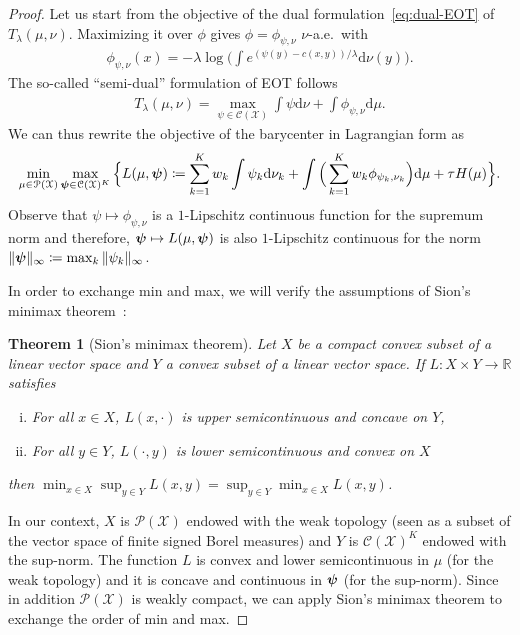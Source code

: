 \documentclass[11pt]{article}
\newcommand{\rev}[1]{{#1}}
\newcommand{\RR}{\mathbb{R}}
\newcommand{\Cc}{\mathcal{C}}
\newcommand{\Pp}{\mathcal{P}}
\newcommand{\Xx}{\mathcal{X}}
\renewcommand{\d}{\mathrm{d}}
\newtheorem{theorem}{Theorem}[section]
\begin{document}
\begin{proof}
Let us start from the objective of the dual formulation~\eqref{eq:dual-EOT} of $T_\lambda(\mu,\nu)$. Maximizing it over $\phi$ gives $\phi=\phi_{\psi,\nu}$ $\nu$-a.e.\ with 
\begin{align}\label{eq:soft-c-transform}
\phi_{\psi,\nu}(x) = -\lambda \log \Big( \int e^{(\psi(y)-c(x,y))/\lambda}\d\nu(y)\Big).
\end{align}
The so-called ``semi-dual'' formulation of EOT follows
\begin{align}\label{eq:semi-dual-EOT}
T_\lambda(\mu,\nu) = \max_{\psi\in \Cc(\Xx)} \int \psi\d\nu +\int \phi_{\psi,\nu}\d\mu.
\end{align}
We can thus rewrite the objective of the barycenter in Lagrangian form as
\begin{align*}
\min_{\mu\in \Pp(\Xx)} \max_{\bpsi \in \Cc(\Xx)^K} \Big\{L(\mu,\bpsi) \coloneqq \sum_{k=1}^K w_k \int  \psi_k\d\nu_k + \int  \Big( \sum_{k=1}^K w_k \phi_{\psi_k,\nu_k}\Big)\d\mu +\tau H(\mu)\Big\}.
\end{align*}
Observe that $\psi\mapsto \phi_{\psi,\nu}$ is a $1$-Lipschitz continuous function for the supremum norm and therefore, ${\boldsymbol{\psi}} \mapsto L(\mu,{\boldsymbol{\psi}})$ is also $1$-Lipschitz continuous for the norm $\Vert {\boldsymbol{\psi}}\Vert_\infty \coloneqq \max_k \Vert \psi_k\Vert_\infty$.
\rev{In order to exchange min and max, we will verify the assumptions of Sion's minimax theorem~\cite[Cor.~3.3]{sion1958general}:
\begin{theorem}[Sion's minimax theorem]\label{thm:Sion}
Let $X$ be a compact convex subset of a linear vector space and $Y$ a convex subset of a linear vector space. If $L:X\times Y\to \RR$ satisfies
\begin{enumerate}[(i)]
\item For all $x\in X$, $L(x,\cdot)$ is upper semicontinuous and concave on $Y$,
\item For all $y \in Y$, $L(\cdot,y)$ is lower semicontinuous and convex on $X$
\end{enumerate}
then $\min_{x\in X}\sup_{y\in Y} L(x,y) = \sup_{y\in Y} \min_{x\in X} L(x,y)$.
\end{theorem}
In our context, $X$ is $\Pp(\Xx)$ endowed with the weak topology (seen as a subset of the vector space of finite signed Borel measures) and $Y$ is $\Cc(\Xx)^K$ endowed with the sup-norm. The function $L$ is convex and lower semicontinuous in $\mu$ (for the weak topology) and it is concave and continuous in ${\boldsymbol{\psi}}$ (for the sup-norm). Since in addition $\Pp(\Xx)$ is weakly compact, we can apply Sion's minimax theorem to exchange the order of min and max.

}
\end{proof}
\end{document}
